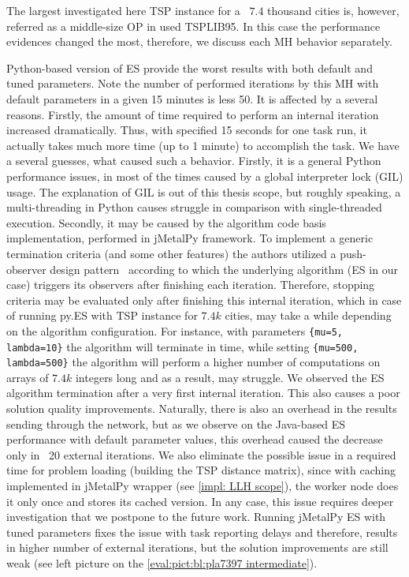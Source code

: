 The largest investigated here TSP instance for a ~$7.4$ thousand cities is, however, referred as a middle-size OP in used TSPLIB95. In this case the performance evidences changed the most, therefore, we discuss each MH behavior separately.

Python-based version of ES provide the worst results with both default and tuned parameters. Note the number of performed iterations by this MH with default parameters in a given 15 minutes is less 50. It is affected by a several reasons. Firstly, the amount of time required to perform an internal iteration increased dramatically. Thus, with specified 15 seconds for one task run, it actually takes much more time (up to 1 minute) to accomplish the task. We have a several guesses, what caused such a behavior. Firstly, it is a general Python performance issues, in most of the times caused by a global interpreter lock (GIL) usage. The explanation of GIL is out of this thesis scope, but roughly speaking, a multi-threading in Python causes struggle in comparison with single-threaded execution. Secondly, it may be caused by the algorithm code basis implementation, performed in jMetalPy framework. To implement a generic termination criteria (and some other features) the authors utilized a push-observer design pattern~\cite{benitez2019jmetalpy} according to which the underlying algorithm (ES in our case) triggers its observers after finishing each iteration. Therefore, stopping criteria may be evaluated only after finishing this internal iteration, which in case of running py.ES with TSP instance for $7.4k$ cities, may take a while depending on the algorithm configuration. For instance, with parameters \texttt{\{mu=5, lambda=10\}} the algorithm will terminate in time, while setting \texttt{\{mu=500, lambda=500\}} the algorithm will perform a higher number of computations on arrays of $7.4k$ integers long and as a result, may struggle. We observed the ES algorithm termination after a very first internal iteration. This also causes a poor solution quality improvements. Naturally, there is also an overhead in the results sending through the network, but as we observe on the Java-based ES performance with default parameter values, this overhead caused the decrease only in ~20 external iterations. We also eliminate the possible issue in a required time for problem loading (building the TSP distance matrix), since with caching implemented in jMetalPy wrapper (see \cref{impl: LLH scope}), the worker node does it only once and stores its cached version. In any case, this issue requires deeper investigation that we postpone to the future work. Running jMetalPy ES with tuned parameters fixes the issue with task reporting delays and therefore, results in higher number of external iterations, but the solution improvements are still weak (see left picture on the \cref{eval:pict:bl:pla7397 intermediate}).

